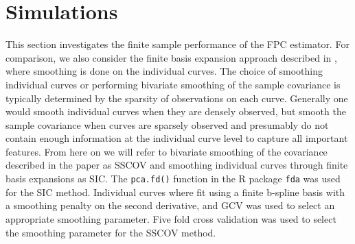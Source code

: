 %
%



\section{Simulations }

This section investigates the finite sample performance of the FPC estimator. For comparison, we also consider the finite basis expansion approach described in \cite{FDA}, where smoothing is done on the individual curves. The choice of smoothing individual curves or performing bivariate smoothing of the sample covariance is typically determined by the sparsity of observations on each curve. Generally one would smooth individual curves when they are densely observed, but smooth the sample covariance when curves are sparsely observed and presumably do not contain enough information at the individual curve level to capture all important features. From here on we will refer to bivariate smoothing of the covariance described in the paper as SSCOV and smoothing individual curves through finite basis expansions as SIC. The \texttt{pca.fd()} function in the R package  \texttt{fda} was used for the SIC method. Individual curves where fit using a finite b-spline basis with a smoothing penalty on the second derivative, and GCV was used to select an appropriate smoothing parameter. Five fold cross validation was used to select the smoothing parameter for the SSCOV method. 

